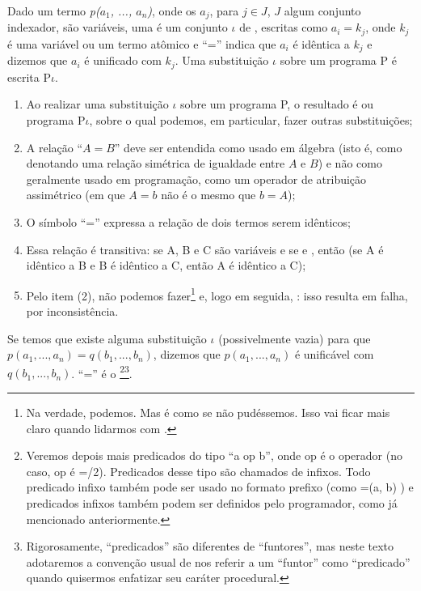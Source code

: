 \documentclass{article}
\begin{document}

\begin{definition} Dado um termo {\it p($a_1$, ..., $a_n$)}, onde os $a_j$, para $j \in J$, $J$ algum conjunto indexador, são variáveis, uma  é um conjunto $\iota$ de , escritas como $a_i = k_j$, onde $k_j$ é uma variável ou um termo atômico e ``='' indica que $a_i$ é idêntica a $k_j$ e dizemos que $a_i$ é unificado com $k_j$.
  Uma substituição $\iota$ sobre um programa P é escrita P$\iota$.
\end{definition}

\begin{remark}
  \hfill
  \begin{enumerate}
    \item Ao realizar uma substituição $\iota$ sobre um programa P, o resultado é ou programa P$\iota$, sobre o qual podemos, em particular, fazer outras substituições;
    \item A relação ``$A = B$'' deve ser entendida como usado em álgebra (isto é, como denotando uma relação simétrica de igualdade entre $A$ e $B$) e não como geralmente usado em programação, como um operador de atribuição assimétrico (em que $A = b$ não é o mesmo que $b = A$);
    \item O símbolo ``='' expressa a relação de dois termos serem idênticos;
    \item Essa relação é transitiva: se A, B e C são variáveis e se  e , então  (se A é idêntico a B e B é idêntico a C, então A é idêntico a C);
    \item Pelo item (2), não podemos fazer\footnote{Na verdade, podemos. Mas é como se não pudéssemos. Isso vai ficar mais claro quando lidarmos com .}  e, logo em seguida, : isso resulta em falha, por inconsistência.
  \end{enumerate}
\end{remark}

Se temos que existe alguma substituição $\iota$ (possivelmente vazia) para que $p(a_1, ..., a_n) = q(b_1, ..., b_n)$, dizemos que  $p(a_1, ..., a_n)$ é unificável com $q(b_1, ..., b_n)$. ``='' é o \footnote{Veremos depois mais
  predicados do tipo ``a op b'', onde op é o operador (no caso, op é =/2). Predicados desse tipo são
  chamados de infixos. Todo predicado infixo também pode ser usado no formato prefixo (como =(a, b)
  ) e predicados infixos também podem ser definidos pelo programador, como já mencionado
  anteriormente.}\footnote{ Rigorosamente, ``predicados'' são diferentes de ``funtores'', mas neste
  texto adotaremos a convenção usual de nos referir a um ``funtor'' como ``predicado'' quando
  quisermos enfatizar seu caráter procedural. }.
\end{document}
